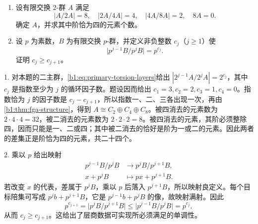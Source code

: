 \begin{exercise}\label{b1:ex:09-torsion-layers}
	\begin{enumerate}
		\item 设有限交换 \(2\)-群 \(A\) 满足
			\[
				|A/2A|=8,\quad |2A/4A|=4,\quad |4A/8A|=2,\quad 8A=0.
			\]
			确定 \(A\)，并求其中阶恰为四的元素个数。
		\item 设 \(p\) 为素数，\(B\) 为有限交换 \(p\)-群，并定义非负整数 \(c_j\)（\(j\geq1\)）使
			\[
				\bigl|p^{j-1}B/p^jB\bigr|=p^{c_j}.
			\]
			证明 \(c_j\geq c_{j+1}\)。
	\end{enumerate}
\end{exercise}
\begin{solution}
	1. 对本题的二主群，\eqref{b1:eq:primary-torsion-layers}给出 \(|2^{j-1}A/2^jA|=2^{c_j}\)，其中 \(c_j\) 是指数至少为 \(j\) 的循环因子数。题设因而给出 \(c_1=3,c_2=2,c_3=1,c_4=0\)。指数恰为 \(j\) 的因子数是 \(c_j-c_{j+1}\)，所以指数一、二、三各出现一次，再由\cref{b1:thm:fga-structure}，得到 \(A\cong C_2\oplus C_4\oplus C_8\)。被四消去的元素数为 \(2\cdot4\cdot4=32\)，被二消去的元素数为 \(2\cdot2\cdot2=8\)。被四消去的元素，其阶必须整除四，因而只能是一、二或四；其中被二消去的恰好是阶为一或二的元素。因此两者的差集正是阶恰为四的元素，共二十四个。

	2. 乘以 \(p\) 给出映射
	\[
		\begin{aligned}
			p^{j-1}B/p^jB&\longrightarrow p^jB/p^{j+1}B,\\
			x+p^jB&\longmapsto px+p^{j+1}B.
		\end{aligned}
	\]
	若改变 \(x\) 的代表，差属于 \(p^jB\)，乘以 \(p\) 后落入 \(p^{j+1}B\)，所以映射良定义。每个目标陪集可写成 \(p^jb+p^{j+1}B\)，它是 \(p^{j-1}b+p^jB\) 的像，故映射满射。因此
	\[
		p^{c_{j+1}} =\bigl|p^jB/p^{j+1}B\bigr| \leq\bigl|p^{j-1}B/p^jB\bigr| =p^{c_j},
	\]
	从而 \(c_j\geq c_{j+1}\)。这给出了层商数据可实现所必须满足的单调性。
\end{solution}

